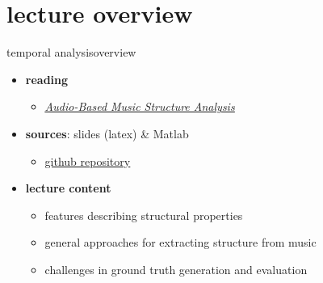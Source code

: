 

\subtitle{Part 12.1: Music Structure Analysis}


	

    \section[overview]{lecture overview}
        \begin{frame}{temporal analysis}{overview}
            \begin{itemize}
                \item   \textbf{reading}  
                    \begin{itemize}
                        \item   \href{http://www.ismir2010.ismir.net/proceedings/ismir2010-107.pdf}{\underline{\textit{Audio-Based Music Structure Analysis}}}
                    \end{itemize}
                \item   \textbf{sources}: slides (latex) \& Matlab  
                    \begin{itemize}
                        \item   \href{https://github.com/alexanderlerch/ACA-Slides}{\underline{github repository}}
                    \end{itemize}
                \bigskip
                \item<2->   \textbf{lecture content}
                    \begin{itemize}
                        \item<2->   features describing structural properties
                        \item<3->   general approaches for extracting structure from music
                        \item<4->   challenges in ground truth generation and evaluation
                    \end{itemize}
            \end{itemize}
        \end{frame}

